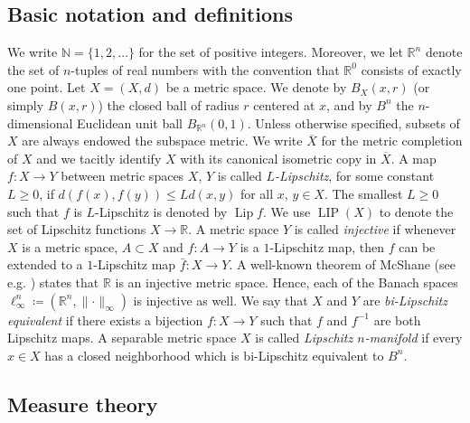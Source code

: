 \documentclass[reqno]{amsart}
\numberwithin{equation}{section}
\newcommand{\R}{\mathbb{R}}
\newcommand{\N}{\mathbb{N}}
\newcommand{\Lip}{\operatorname{Lip}}
\newcommand{\LIP}{\operatorname{LIP}}
\newcommand{\norm}[1]{\lVert#1\rVert}
\begin{document}
\subsection{Basic notation and definitions} We write \(\N=\{ 1, 2, \dots\}\) for the set of positive integers. Moreover, we let \(\R^n\) denote the set of \(n\)-tuples of real numbers with the convention that \(\R^0\) consists of exactly one point.  
Let \(X=(X, d)\) be a metric space. We denote by $B_X(x,r)$ (or simply $B(x,r)$) the closed ball of radius $r$ centered at $x$, and by $B^n$ the $n$-dimensional Euclidean unit ball $B_{\mathbb{R}^n}(0,1)$.  Unless otherwise specified, subsets of \(X\) are always endowed the subspace 
metric. We write \(\overline{X}\) for the metric completion of \(X\) and we tacitly identify \(X\) with its canonical isometric copy in \(\overline{X}\). A map \(f\colon X\to Y\) between metric spaces \(X\), \(Y\) is called \emph{\(L\)-Lipschitz}, for some constant \(L\geq 0\), if 
\(
d(f(x), f(y)) \leq L d(x,y)
\)
for all \(x\), \(y\in X\). The smallest \(L\geq 0\) such that \(f\) is \(L\)-Lipschitz is denoted by \(\Lip f\). We use $\LIP(X)$ to denote the set of Lipschitz functions $X\to \R$. A metric space $Y$ is called \emph{injective} if whenever $X$ is a metric space, $A\subset X$ and $f\colon A\to Y$ is a $1$-Lipschitz map, then $f$ can be extended to a $1$-Lipschitz map $\bar{f}\colon X\to Y$.  A well-known theorem of McShane (see e.g. \cite[Theorem 1.27]{brudnyi2012}) states that \(\R\) is an injective metric space. Hence, each of the Banach spaces \(\ell_\infty^n\coloneqq(\R^n, \norm{\cdot}_\infty)\) is injective as well. We say that \(X\) and \(Y\) are \emph{bi-Lipschitz equivalent} if there exists a bijection \(f\colon X \to Y\) such that \(f\) and \(f^{-1}\) are both Lipschitz maps.  A separable metric space \(X\) is called \emph{Lipschitz \(n\)-manifold} if every \(x\in X\) has a closed neighborhood which is bi-Lipschitz equivalent to \(B^n\). 


\subsection{Measure theory}
\end{document}
